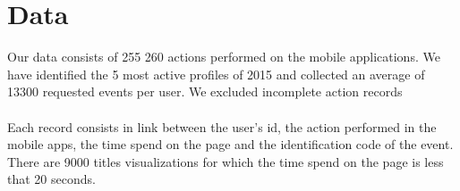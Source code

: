 \section*{Data}

Our data consists of 255 260 actions performed on the mobile applications. We have identified the 5 most active profiles of 2015 and collected an average of 13300 requested events per user. We excluded incomplete action records\\
\\
Each record consists in link between the user's id, the action performed in the mobile apps, the time spend on the page and the identification code of the event. There are 9000 titles visualizations for which the time spend on the page is less that 20 seconds.
%
%	
%
